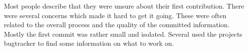 Most people describe that they were unsure about their first contribution. There were several concerns which made it hard to get it going. These were often related to the overall process and the quality of the committed information. Mostly the first commit was rather small and isolated. Several used the projects bugtracker to find some information on what to work on. 